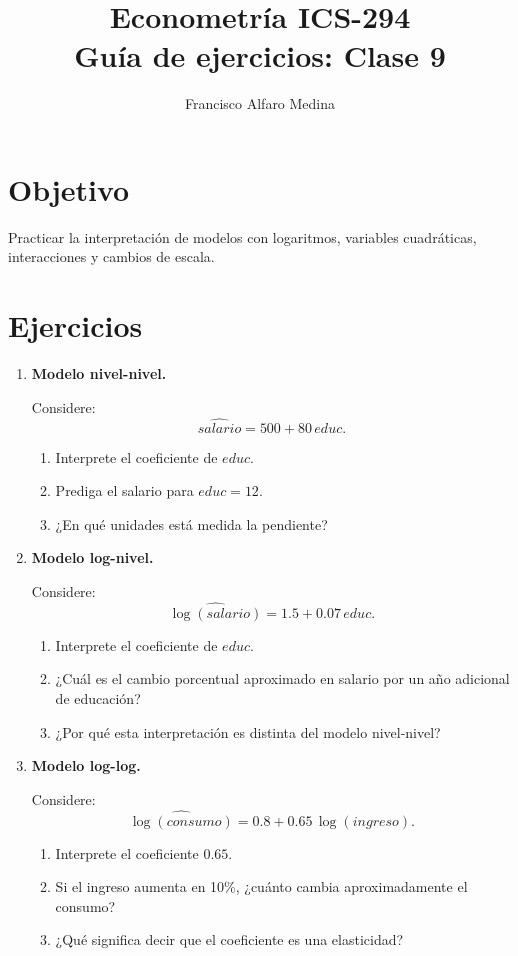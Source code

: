 \documentclass[11pt]{article}
\title{Econometría ICS-294\\Guía de ejercicios: Clase 9}
\author{Francisco Alfaro Medina}
\date{}
\begin{document}
\maketitle

\section*{Objetivo}

Practicar la interpretación de modelos con logaritmos, variables cuadráticas, interacciones y cambios de escala.

\section*{Ejercicios}

\begin{enumerate}[label=\textbf{Ejercicio \arabic*.}, leftmargin=*]

\item \textbf{Modelo nivel-nivel.}

Considere:
\[
\widehat{salario}=500+80\,educ.
\]

\begin{enumerate}[label=\alph*)]
    \item Interprete el coeficiente de \(educ\).
    \item Prediga el salario para \(educ=12\).
    \item ¿En qué unidades está medida la pendiente?
\end{enumerate}

\item \textbf{Modelo log-nivel.}

Considere:
\[
\widehat{\log(salario)}=1.5+0.07\,educ.
\]

\begin{enumerate}[label=\alph*)]
    \item Interprete el coeficiente de \(educ\).
    \item ¿Cuál es el cambio porcentual aproximado en salario por un año adicional de educación?
    \item ¿Por qué esta interpretación es distinta del modelo nivel-nivel?
\end{enumerate}

\item \textbf{Modelo log-log.}

Considere:
\[
\widehat{\log(consumo)}=0.8+0.65\,\log(ingreso).
\]

\begin{enumerate}[label=\alph*)]
    \item Interprete el coeficiente \(0.65\).
    \item Si el ingreso aumenta en 10\%, ¿cuánto cambia aproximadamente el consumo?
    \item ¿Qué significa decir que el coeficiente es una elasticidad?
\end{enumerate}


\end{enumerate}
\end{document}
